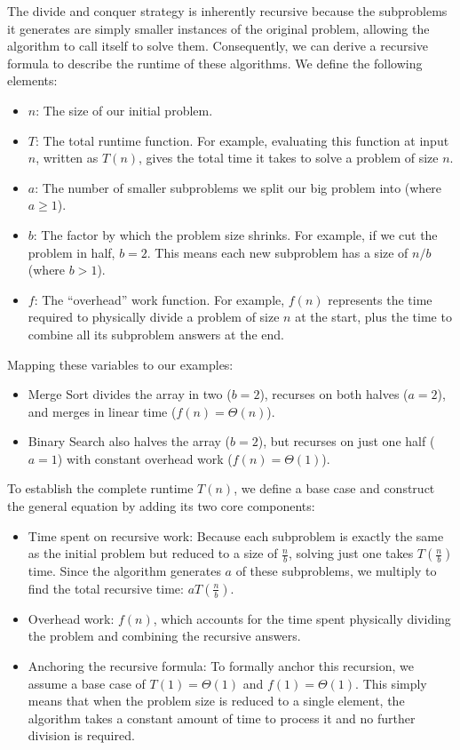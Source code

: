 The divide and conquer strategy is inherently recursive because the subproblems it generates are simply smaller instances of the original problem, allowing the algorithm to call itself to solve them. Consequently, we can derive a recursive formula to describe the runtime of these algorithms. We define the following elements:
\begin{itemize}
    \item $n$: The size of our initial problem.
    \item $T$: The total runtime function. For example, evaluating this function at input $n$, written as $T(n)$, gives the total time it takes to solve a problem of size $n$.
    \item $a$: The number of smaller subproblems we split our big problem into (where $a \ge 1$).
    \item $b$: The factor by which the problem size shrinks. For example, if we cut the problem in half, $b = 2$. This means each new subproblem has a size of $n/b$ (where $b > 1$).
    \item $f$: The ``overhead'' work function. For example, $f(n)$ represents the time required to physically divide a problem of size $n$ at the start, plus the time to combine all its subproblem answers at the end.
\end{itemize}
Mapping these variables to our examples:
\begin{itemize}
    \item Merge Sort divides the array in two ($b=2$), recurses on both halves ($a=2$), and merges in linear time ($f(n) = \Theta(n)$).

    \item  Binary Search also halves the array ($b=2$), but recurses on just one half ($a=1$) with constant overhead work ($f(n) = \Theta(1)$).
\end{itemize}


To establish the complete runtime $T(n)$, we define a base case and construct the general equation by adding its two core components:

\begin{itemize}
    \item Time spent on recursive work: Because each subproblem is exactly the same as the initial problem but reduced to a size of $\frac{n}{b}$, solving just one takes $T\left(\frac{n}{b}\right)$ time. Since the algorithm generates $a$ of these subproblems, we multiply to find the total recursive time: $aT\left(\frac{n}{b}\right)$.

    \item Overhead work: $f(n)$, which accounts for the time spent physically dividing the problem and combining the recursive answers. 

    \item Anchoring the recursive formula: To formally anchor this recursion, we assume a base case of $T(1) = \Theta(1)$ and $f(1) = \Theta(1)$. This simply means that when the problem size is reduced to a single element, the algorithm takes a constant amount of time to process it and no further division is required.
\end{itemize}

